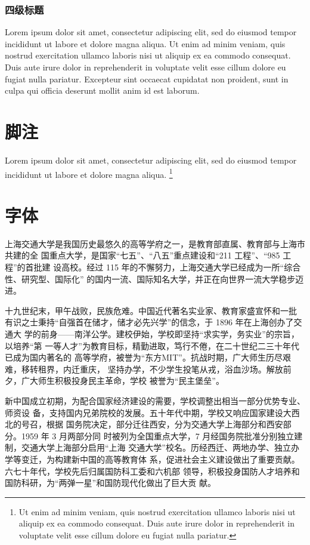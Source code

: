 \subsubsection{四级标题}

Lorem ipsum dolor sit amet, consectetur adipiscing elit, sed do eiusmod tempor
incididunt ut labore et dolore magna aliqua. Ut enim ad minim veniam, quis
nostrud exercitation ullamco laboris nisi ut aliquip ex ea commodo consequat.
Duis aute irure dolor in reprehenderit in voluptate velit esse cillum dolore eu
fugiat nulla pariatur. Excepteur sint occaecat cupidatat non proident, sunt in
culpa qui officia deserunt mollit anim id est laborum.

\section{脚注}

Lorem ipsum dolor sit amet, consectetur adipiscing elit, sed do eiusmod tempor
incididunt ut labore et dolore magna aliqua. \footnote{Ut enim ad minim veniam,
quis nostrud exercitation ullamco laboris nisi ut aliquip ex ea commodo
consequat. Duis aute irure dolor in reprehenderit in voluptate velit esse cillum
dolore eu fugiat nulla pariatur.}

\section{字体}


上海交通大学是我国历史最悠久的高等学府之一，是教育部直属、教育部与上海市共建的全
国重点大学，是国家“七五”、“八五”重点建设和“211 工程”、“985 工程”的首批建
设高校。经过 115 年的不懈努力，上海交通大学已经成为一所“综合性、研究型、国际化”
的国内一流、国际知名大学，并正在向世界一流大学稳步迈进。 

{\songti 十九世纪末，甲午战败，民族危难。中国近代著名实业家、教育家盛宣怀和一批
  有识之士秉持“自强首在储才，储才必先兴学”的信念，于 1896 年在上海创办了交通大
  学的前身——南洋公学。建校伊始，学校即坚持“求实学，务实业”的宗旨，以培养“第
  一等人才”为教育目标，精勤进取，笃行不倦，在二十世纪二三十年代已成为国内著名的
  高等学府，被誉为“东方MIT”。抗战时期，广大师生历尽艰难，移转租界，内迁重庆，
  坚持办学，不少学生投笔从戎，浴血沙场。解放前夕，广大师生积极投身民主革命，学校
  被誉为“民主堡垒”。
  
  新中国成立初期，为配合国家经济建设的需要，学校调整出相当一部分优势专业、师资设
  备，支持国内兄弟院校的发展。五十年代中期，学校又响应国家建设大西北的号召，根据
  国务院决定，部分迁往西安，分为交通大学上海部分和西安部分。1959 年 3 月两部分同
  时被列为全国重点大学，7 月经国务院批准分别独立建制，交通大学上海部分启用“上海
  交通大学”校名。历经西迁、两地办学、独立办学等变迁，为构建新中国的高等教育体
  系，促进社会主义建设做出了重要贡献。六七十年代，学校先后归属国防科工委和六机部
  领导，积极投身国防人才培养和国防科研，为“两弹一星”和国防现代化做出了巨大贡
  献。}

